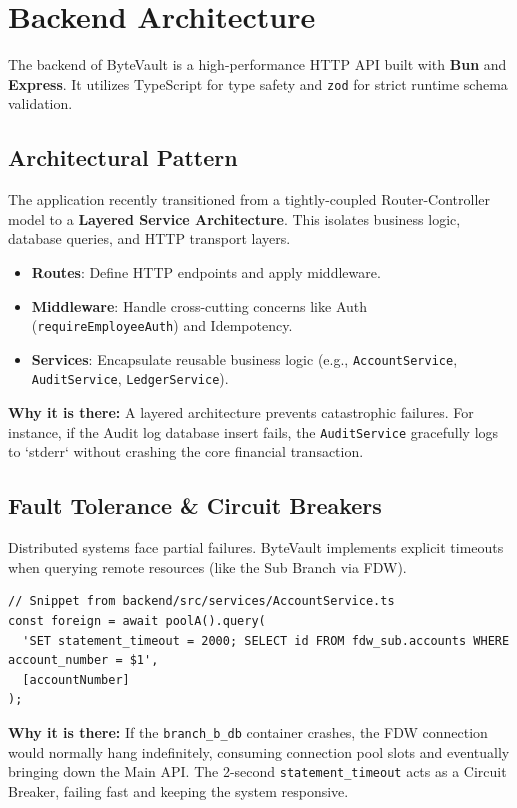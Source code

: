 \section{Backend Architecture}

The backend of ByteVault is a high-performance HTTP API built with \textbf{Bun} and \textbf{Express}. It utilizes TypeScript for type safety and \texttt{zod} for strict runtime schema validation.

\subsection{Architectural Pattern}
The application recently transitioned from a tightly-coupled Router-Controller model to a \textbf{Layered Service Architecture}. This isolates business logic, database queries, and HTTP transport layers.

\begin{itemize}
    \item \textbf{Routes}: Define HTTP endpoints and apply middleware.
    \item \textbf{Middleware}: Handle cross-cutting concerns like Auth (\texttt{requireEmployeeAuth}) and Idempotency.
    \item \textbf{Services}: Encapsulate reusable business logic (e.g., \texttt{AccountService}, \texttt{AuditService}, \texttt{LedgerService}).
\end{itemize}

\textbf{Why it is there:} A layered architecture prevents catastrophic failures. For instance, if the Audit log database insert fails, the \texttt{AuditService} gracefully logs to `stderr` without crashing the core financial transaction. 

\subsection{Fault Tolerance \& Circuit Breakers}
Distributed systems face partial failures. ByteVault implements explicit timeouts when querying remote resources (like the Sub Branch via FDW).

\begin{lstlisting}[style=typescript]
// Snippet from backend/src/services/AccountService.ts
const foreign = await poolA().query(
  'SET statement_timeout = 2000; SELECT id FROM fdw_sub.accounts WHERE account_number = $1',
  [accountNumber]
);
\end{lstlisting}

\textbf{Why it is there:} If the \texttt{branch\_b\_db} container crashes, the FDW connection would normally hang indefinitely, consuming connection pool slots and eventually bringing down the Main API. The 2-second \texttt{statement\_timeout} acts as a Circuit Breaker, failing fast and keeping the system responsive.


